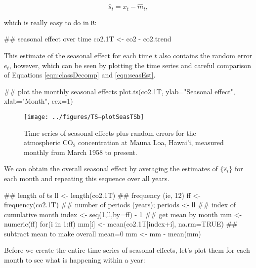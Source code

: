 \begin{equation}\label{eqn:seasEst}
\hat{s}_t = x_t - \hat{m}_t,
\end{equation}

\noindent which is really easy to do in \texttt{R}:

\begin{Schunk}
\begin{Sinput}
 ## seasonal effect over time
 co2.1T <- co2 - co2.trend
\end{Sinput}
\end{Schunk}

This estimate of the seasonal effect for each time $t$ also contains the random error $e_t$, however, which can be seen by plotting the time series and careful comparison of Equations \eqref{eqn:classDecomp} and \eqref{eqn:seasEst}.

\begin{Schunk}
\begin{Sinput}
 ## plot the monthly seasonal effects
 plot.ts(co2.1T, ylab="Seasonal effect", xlab="Month", cex=1)
\end{Sinput}
\end{Schunk}

\begin{figure}[htp]
\begin{center}
\texttt{[image: ../figures/TS--plotSeasTSb]}
\end{center}
\caption{Time series of seasonal effects plus random errors for the atmospheric CO$_2$ concentration at Mauna Loa, Hawai'i, measured monthly from March 1958 to present.}
\label{fig:LW1.figSeasTS}
\end{figure}

We can obtain the overall seasonal effect by averaging the estimates of $\{\hat{s}_t\}$ for each month and repeating this sequence over all years.

\begin{Schunk}
\begin{Sinput}
 ## length of ts
 ll <- length(co2.1T)
 ## frequency (ie, 12)
 ff <- frequency(co2.1T)
 ## number of periods (years); %/% is integer division
 periods <- ll %/% ff
 ## index of cumulative month
 index <- seq(1,ll,by=ff) - 1
 ## get mean by month
 mm <- numeric(ff)
 for(i in 1:ff) {
   mm[i] <- mean(co2.1T[index+i], na.rm=TRUE)
 }
 ## subtract mean to make overall mean=0
 mm <- mm - mean(mm)
\end{Sinput}
\end{Schunk}

Before we create the entire time series of seasonal effects, let's plot them for each month to see what is happening within a year:

